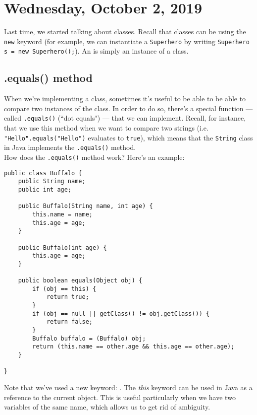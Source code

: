 \section{Wednesday, October 2, 2019}

Last time, we started talking about classes. Recall that classes can be  using the \verb!new! keyword (for example, we can instantiate a \verb!Superhero! by writing \verb!Superhero s = new Superhero();!). An  is simply an instance of a class.

\subsection{.equals() method}

When we're implementing a class, sometimes it's useful to be able to be able to compare two instances of the class. In order to do so, there's a special function --- called \verb!.equals()! (``dot equals") --- that we can implement. Recall, for instance, that we use this method when we want to compare two strings (i.e. \verb!"Hello".equals("Hello")! evaluates to \verb!true!), which means that the \verb!String! class in Java implements the \verb!.equals()! method. \\

How does the \verb!.equals()! method work? Here's an example:

\begin{lstlisting}
public class Buffalo {
    public String name;
    public int age;
    
    public Buffalo(String name, int age) {
        this.name = name;
        this.age = age;
    }
    
    public Buffalo(int age) {
        this.age = age;
    }
    
    public boolean equals(Object obj) {
        if (obj == this) {
            return true;
        }
        if (obj == null || getClass() != obj.getClass()) {
            return false;
        }
        Buffalo buffalo = (Buffalo) obj;
        return (this.name == other.age && this.age == other.age);
    }
    
}
\end{lstlisting}

Note that we've used a new keyword: . The \textit{this} keyword can be used in Java as a reference to the current object. This is useful particularly when we have two variables of the same name, which allows us to get rid of ambiguity. \\

